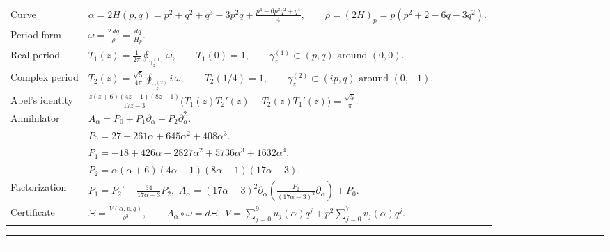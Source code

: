 \documentclass[9pt]{extarticle}
\newcommand{\pa}{\partial_{\alpha}}
\newcommand{\DoubleRule}{\par\vspace{3pt}\hrule height 0.65pt\vspace{1.3pt}\hrule height 0.28pt\vspace{5.2pt}}
\begin{document}
{\fontsize{8.95}{11.0}\selectfont
\renewcommand{\arraystretch}{1.30}
\begin{tabularx}{\textwidth}{@{}H@{\hspace{0.10in}}Y@{}}
Curve &
$\displaystyle \alpha=2H(p,q)=p^2+q^2+q^3-3p^2q+\frac{p^4-6p^2q^2+q^4}{4},
\qquad \rho=(2H)_p=p(p^2+2-6q-3q^2).$ \\[7pt]
Period form &
$\displaystyle \omega=\frac{2\,dq}{\rho}=\frac{dq}{H_p}.$ \\[4pt]
Real period &
$\displaystyle T_1(z)=\frac{1}{2\pi}\oint_{\gamma_z^{(1)}}\omega,\qquad
T_1(0)=1,\qquad \gamma_z^{(1)}\subset(p,q)\text{ around }(0,0).$ \\[4pt]
Complex period &
$\displaystyle T_2(z)=\frac{\sqrt5}{4\pi}\oint_{\gamma_z^{(2)}} i\,\omega,\qquad
T_2(1/4)=1,\qquad \gamma_z^{(2)}\subset(ip,q)\text{ around }(0,-1).$
\\[6pt]
Abel's identity &
$\displaystyle
\frac{z(z+6)(4z-1)(8z-1)}{17z-3}
\bigl(T_1(z)T_2'(z)-T_2(z)T_1'(z)\bigr)
=\frac{\sqrt5}{\pi}.$ \\[7pt]
Annihilator &
$\displaystyle A_\alpha=P_0+P_1\pa+P_2\pa^2.$ \\[2pt]
& \hspace{1.25em}$\displaystyle P_0=27-261\alpha+645\alpha^2+408\alpha^3.$ \\[1pt]
& \hspace{1.25em}$\displaystyle P_1=-18+426\alpha-2827\alpha^2+5736\alpha^3+1632\alpha^4.$ \\[1pt]
& \hspace{1.25em}$\displaystyle P_2=\alpha(\alpha+6)(4\alpha-1)(8\alpha-1)(17\alpha-3).$ \\[7pt]
Factorization &
$\displaystyle P_1=P_2'-\frac{34}{17\alpha-3}P_2,$
\qquad
$\displaystyle A_\alpha=(17\alpha-3)^2\pa\!\left(\frac{P_2}{(17\alpha-3)^2}\pa\right)+P_0.$ \\[8pt]
Certificate &
$\displaystyle \Xi=\frac{V(\alpha,p,q)}{\rho^3},\qquad
A_\alpha\circ\omega=d\Xi,$
\qquad
$\displaystyle V=\sum_{j=0}^{9}u_j(\alpha)q^j+p^2\sum_{j=0}^{7}v_j(\alpha)q^j.$
\end{tabularx}
}

\DoubleRule
\end{document}
